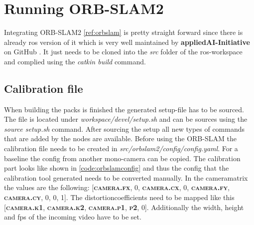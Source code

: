 \section{Running ORB-SLAM2}\label{ref:runningorbslam}
Integrating ORB-SLAM2 \ref{ref:orbslam} is pretty straight forward since there is already \gls{ros} version of it which is very well maintained by \textbf{appliedAI-Initiative} on GitHub \cite{orbslam2rosgithub}. It just needs to be cloned into the \textit{src} folder of the \gls{ros}-workspace and complied using the \textit{catkin build} command. \newline

\subsection{Calibration file}
When building the packs is finished the generated setup-file has to be sourced. The file is located under \textit{workspace/devel/setup.sh} and can be sources using the \textit{source setup.sh} command. After sourcing the setup all new types of commands that are added by the nodes are available.\newline
Before using the ORB-SLAM the calibration file needs to be created in \textit{src/orb\textunderscore slam2/config/config.yaml}. For a baseline the config from another mono-camera can be copied. The calibration part looks like shown in \ref{code:orbslamconfig} and thus the config that the calibration tool generated needs to be converted manually. In the camera\textunderscore matrix the values are the following: \textsc{[\textbf{camera.fx}, 0, \textbf{camera.cx}, 0, \textbf{camera.fy}, \textbf{camera.cy}, 0, 0, 1]}. The distortion\textunderscore coefficients need to be mapped like this \textsc{[\textbf{camera.k1}, \textbf{camera.k2}, \textbf{camera.p1}, \textbf{p2}, 0]}. Additionally the width, height and \gls{fps} of the incoming video have to be set.\newline


